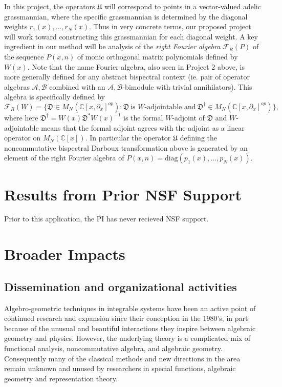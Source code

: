 \documentclass[11pt,letterpaper]{article}
\theoremstyle{definition}
\newcommand{\bbc}{\mathbb{C}}
\begin{document}
In this project, the operators $\mathfrak U$ will correspond to points in a vector-valued adelic grassmannian, where the specific grassmannian is determined by the diagonal weights $r_1(x),\dots, r_N(x)$.
Thus in very concrete terms, our proposed project will work toward constructing this grassmannian for each diagonal weight.  A key ingredient in our method will be analysis of the \emph{right Fourier algebra} $\mathcal F_R(P)$ of the sequence $P(x,n)$ of monic orthogonal matrix polynomials defined by $W(x)$.
Note that the name Fourier algebra, also seen in Project 2 above, is more generally defined for any abstract bispectral context (ie. pair of operator algebras $\mathcal A,\mathcal B$ combined with an $\mathcal A,\mathcal B$-bimodule with trivial annihilators).
This algebra is specifically defined by
$$\mathcal F_R(W) = \{\mathfrak D\in M_N(\bbc[x,\partial_x]^{op}): \mathfrak D\ \text{is $W$-adjointable and}\ \mathfrak D^\dag\in M_N(\bbc[x,\partial_x]^{op})\},$$
where here $\mathfrak D^\dag = W(x)\mathfrak D^* W(x)^{-1}$ is the formal $W$-adjoint of $\mathfrak D$ and $W$-adjointable means that the formal adjoint agrees with the adjoint as a linear operator on $M_N(\bbc[x])$.
In particular the operator $\mathfrak U$ defining the  noncommutative bispectral Darboux transformation above is generated by an element of the right Fourier algebra of $P(x,n) = \text{diag}(p_1(x),\dots,p_N(x))$.


\section{Results from Prior NSF Support}
Prior to this application, the PI has never recieved NSF support.
\section{Broader Impacts}
\subsection{Dissemination and organizational activities}
Algebro-geometric techniques in integrable systems have been an active point of continued research and expansion since their conception in the 1980's, in part because of the unusual and beautiful interactions they inspire between algebraic geometry and physics.
However, the underlying theory is a complicated mix of functional analysis, noncommutative algebra, and algebraic geometry.
Consequently many of the classical methods and new directions in the area remain unknown and unused by researchers in special functions, algebraic geometry and representation theory.
\end{document}

